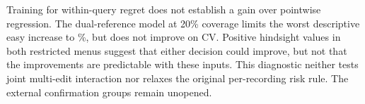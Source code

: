 Training for within-query regret does not establish a gain over
pointwise regression. The dual-reference model at 20\% coverage
limits the worst descriptive easy increase to \OpenDDLowDualEasy\%,
but does not improve on CV. Positive hindsight values in both
restricted menus suggest that either decision could improve, but
not that the improvements are predictable with these inputs. This
diagnostic neither tests joint multi-edit interaction nor relaxes
the original per-recording risk rule. The external confirmation
groups remain unopened.
